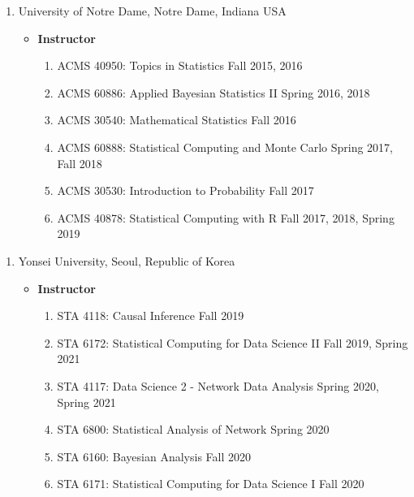 \documentclass[
]{book}
\providecommand{\tightlist}{%
  \setlength{\itemsep}{0pt}\setlength{\parskip}{0pt}}
\begin{document}
\begin{enumerate}
\def\labelenumi{\arabic{enumi}.}
\setcounter{enumi}{1}
\item
  University of Notre Dame, Notre Dame, Indiana USA

  \begin{itemize}
  \tightlist
  \item
    \textbf{Instructor}

    \begin{enumerate}
    \def\labelenumii{\arabic{enumii}.}
    \tightlist
    \item
      ACMS 40950: Topics in Statistics Fall 2015, 2016
    \item
      ACMS 60886: Applied Bayesian Statistics II Spring 2016, 2018
    \item
      ACMS 30540: Mathematical Statistics Fall 2016
    \item
      ACMS 60888: Statistical Computing and Monte Carlo Spring 2017, Fall 2018
    \item
      ACMS 30530: Introduction to Probability Fall 2017
    \item
      ACMS 40878: Statistical Computing with R Fall 2017, 2018, Spring 2019
    \end{enumerate}
  \end{itemize}
\end{enumerate}

\begin{enumerate}
\def\labelenumi{\arabic{enumi}.}
\setcounter{enumi}{2}
\item
  Yonsei University, Seoul, Republic of Korea

  \begin{itemize}
  \tightlist
  \item
    \textbf{Instructor}

    \begin{enumerate}
    \def\labelenumii{\arabic{enumii}.}
    \tightlist
    \item
      STA 4118: Causal Inference Fall 2019
    \item
      STA 6172: Statistical Computing for Data Science II Fall 2019, Spring 2021
    \item
      STA 4117: Data Science 2 - Network Data Analysis Spring 2020, Spring 2021
    \item
      STA 6800: Statistical Analysis of Network Spring 2020
    \item
      STA 6160: Bayesian Analysis Fall 2020
    \item
      STA 6171: Statistical Computing for Data Science I Fall 2020
    \end{enumerate}
  \end{itemize}
\end{enumerate}
\end{document}
